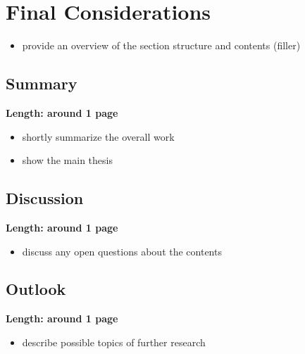 \section{Final Considerations}

\begin{itemize}
  \item provide an overview of the section structure and contents (filler)
\end{itemize}

\subsection{Summary}

\textbf{Length: around 1 page}

\begin{itemize}
  \item shortly summarize the overall work
  \item show the main thesis
\end{itemize}

\subsection{Discussion}

\textbf{Length: around 1 page}

\begin{itemize}
  \item discuss any open questions about the contents
\end{itemize}

\subsection{Outlook}

\textbf{Length: around 1 page}

\begin{itemize}
  \item describe possible topics of further research
\end{itemize}
